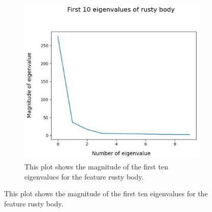 
\begin{figure}[!h]
	\centering
	\begin{subfigure}{0.7\textwidth}
		\includegraphics[width=0.9\linewidth]{Figures/chapter04/pca_rustybody_graph.png} 
		\caption{This plot shows the magnitude of the first ten eigenvalues for the feature rusty body.}
	\end{subfigure}
	\vspace{20pt}
	

\end{figure}
